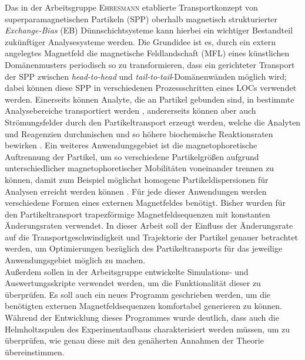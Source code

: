 \documentclass[page,pdftex,12pt,a4paper,twoside,openright]{scrbook}
\begin{document}
Das in der Arbeitsgruppe \textsc{Ehresmann} etablierte Transportkonzept von superparamagnetischen Partikeln (SPP) oberhalb magnetisch strukturierter \emph{Exchange-Bias} (EB) Dünnschichtsysteme kann hierbei ein wichtiger Bestandteil zukünftiger Analysesysteme werden. Die Grundidee ist es, durch ein extern angelegtes Magnetfeld die magnetische Feldlandschaft (MFL) eines künstlichen Domänenmusters periodisch so zu transformieren, dass ein gerichteter Transport der SPP zwischen \emph{head-to-head} und \emph{tail-to-tail}-Domänenwänden möglich wird; dabei können diese SPP in verschiedenen Prozessschritten eines LOCs verwendet werden. Einerseits können Analyte, die an Partikel gebunden sind, in bestimmte Analysebereiche transportiert werden \cite{ehresmann_asymmetric_2011}, andererseits können aber auch Strömungsfelder durch den Partikeltransport erzeugt werden, welche die Analyten und Reagenzien durchmischen und so höhere biochemische Reaktionsraten bewirken \cite{holzinger_controlled_2012}. Ein weiteres Anwendungsgebiet ist die magnetophoretische Auftrennung der Partikel, um so verschiedene Partikelgrößen aufgrund unterschiedlicher magnetophoretischer Mobilitäten voneinander trennen zu können, damit zum Beispiel möglichst homogene Partikeldispersionen für Analysen erreicht werden können \cite{zhou_magnetic_2016}. Für jede dieser Anwendungen werden verschiedene Formen eines externen Magnetfeldes benötigt. Bisher wurden für den Partikeltransport trapezförmige Magnetfeldsequenzen mit konstanten Änderungsraten verwendet. In dieser Arbeit soll der Einfluss der Änderungsrate auf die Transportgeschwindigkeit und Trajektorie der Partikel genauer betrachtet werden, um Optimierungen bezüglich des Partikeltransports für das jeweilige Anwendungsgebiet möglich zu machen.\\

Außerdem sollen in der Arbeitsgruppe entwickelte Simulations- \cite{holzinger_pythonscript_nodate-1} und Auswertungsskripte \cite{holzinger_pythonscript_nodate} verwendet werden, um die Funktionalität dieser zu überprüfen. Es soll auch ein neues Programm geschrieben werden, um die benötigten externen Magnetfeldsequenzen komfortabel generieren zu können. Während der Entwicklung dieses Programmes wurde deutlich, dass auch die Helmholtzspulen des Experimentaufbaus charakterisiert werden müssen, um zu überprüfen, wie genau diese mit den genäherten Annahmen der Theorie übereinstimmen.\\
\end{document}
